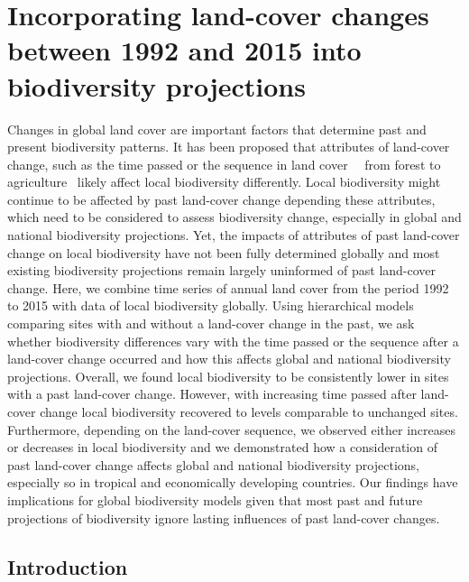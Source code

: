 \chapter{Incorporating land-cover changes between 1992 and 2015 into biodiversity projections }
\label{C04}

Changes in global land cover are important factors that determine past and present biodiversity patterns. It has been proposed that attributes of land-cover change, such as the time passed or the sequence in land cover \textendash\ \ie\ from forest to agriculture \textendash\ likely affect local biodiversity differently. Local biodiversity might continue to be affected by past land-cover change depending these attributes, which need to be considered to assess biodiversity change, especially in global and national biodiversity projections. Yet, the impacts of attributes of past land-cover change on local biodiversity have not been fully determined globally and most existing biodiversity projections remain largely uninformed of past land-cover change. Here, we combine time series of annual land cover from the period 1992 to 2015 with data of local biodiversity globally. Using hierarchical models comparing sites with and without a land-cover change in the past, we ask whether biodiversity differences vary with the time passed or the sequence after a land-cover change occurred and how this affects global and national biodiversity projections. Overall, we found local biodiversity to be consistently lower in sites with a past land-cover change. However, with increasing time passed after land-cover change local biodiversity recovered to levels comparable to unchanged sites. Furthermore, depending on the land-cover sequence, we observed either increases or decreases in local biodiversity and we demonstrated how a consideration of past land-cover change affects global and national biodiversity projections, especially so in tropical and economically developing countries. Our findings have implications for global biodiversity models given that most past and future projections of biodiversity ignore lasting influences of past land-cover changes. 

\section{Introduction}
\label{C04_01}

